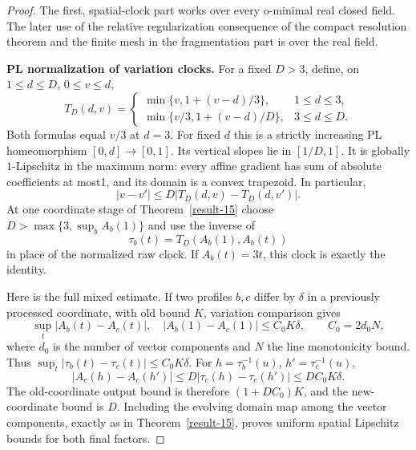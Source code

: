 \documentclass[11pt,a4paper]{article}
\theoremstyle{definition}
\begin{document}
\begin{proof}
The first, spatial-clock part works over every o-minimal real
closed field. The later use of the relative regularization consequence of the compact resolution theorem and the finite mesh in
the fragmentation part is over the real field.

\textbf{PL normalization of variation clocks.}\quad
For a fixed $D>3$, define, on $1\le d\le D$, $0\le v\le d$,
\begin{equation}
 T_D(d,v)=
 \begin{cases}
 \min\{v,1+(v-d)/3\},&1\le d\le3,\\
 \min\{v/3,1+(v-d)/D\},&3\le d\le D.
 \end{cases}
 \label{equation-95}
\end{equation}
Both formulas equal $v/3$ at $d=3$. For fixed $d$ this is a
strictly increasing PL homeomorphism $[0,d]\to[0,1]$.
Its vertical slopes lie in $[1/D,1]$. It is globally
$1$-Lipschitz in the maximum norm: every affine gradient
has sum of absolute coefficients at most1, and its domain
is a convex trapezoid. In particular,
\begin{equation}
 |v-v'|\le D|T_D(d,v)-T_D(d,v')|.
 \label{equation-96}
\end{equation}
At one coordinate stage of Theorem~\ref{result-15} choose
$D>\max\{3,\sup_b A_b(1)\}$ and use the inverse of
\begin{equation}
 \tau_b(t)=T_D(A_b(1),A_b(t))
 \label{equation-97}
\end{equation}
in place of the normalized raw clock. If $A_b(t)=3t$,
this clock is exactly the identity.

Here is the full mixed estimate. If two profiles $b,c$
differ by $\delta$ in a previously processed coordinate,
with old bound $K$, variation comparison gives
\[
 \sup_t|A_b(t)-A_c(t)|,\quad |A_b(1)-A_c(1)|
       \le C_0K\delta,\qquad C_0=2d_0N,
\]
where $d_0$ is the number of vector components and $N$ the
line monotonicity bound. Thus
$\sup_t|\tau_b(t)-\tau_c(t)|\le C_0K\delta$.
For $h=\tau_b^{-1}(u)$, $h'=\tau_c^{-1}(u)$,
\begin{equation}
 |A_c(h)-A_c(h')|
 \le D|\tau_c(h)-\tau_c(h')|
 \le DC_0K\delta.
 \label{equation-98}
\end{equation}
The old-coordinate output bound is therefore
$(1+DC_0)K$, and the new-coordinate bound is $D$.
Including the evolving domain map among the vector
components, exactly as in Theorem~\ref{result-15}, proves uniform spatial
Lipschitz bounds for both final factors.


\end{proof}
\end{document}
